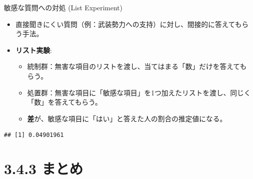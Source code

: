 \documentclass[
  ignorenonframetext,
]{beamer}
\newenvironment{Shaded}{\begin{snugshade}}{\end{snugshade}}
\newcommand{\CommentTok}[1]{\textcolor[rgb]{0.56,0.35,0.01}{\textit{#1}}}
\newcommand{\FunctionTok}[1]{\textcolor[rgb]{0.00,0.00,0.00}{#1}}
\newcommand{\NormalTok}[1]{#1}
\newcommand{\SpecialCharTok}[1]{\textcolor[rgb]{0.00,0.00,0.00}{#1}}
\newcommand{\StringTok}[1]{\textcolor[rgb]{0.31,0.60,0.02}{#1}}
\providecommand{\tightlist}{%
  \setlength{\itemsep}{0pt}\setlength{\parskip}{0pt}}
\begin{document}
\begin{frame}[fragile]{敏感な質問への対処 (List Experiment)}
\protect\hypertarget{ux654fux611fux306aux8ceaux554fux3078ux306eux5bfeux51e6-list-experiment}{}
\begin{itemize}
\tightlist
\item
  直接聞きにくい質問（例：武装勢力への支持）に対し、間接的に答えてもらう手法。
\item
  \textbf{リスト実験}:

  \begin{itemize}
  \tightlist
  \item
    統制群：無害な項目のリストを渡し、当てはまる「数」だけを答えてもらう。
  \item
    処置群：無害な項目に「敏感な項目」を1つ加えたリストを渡し、同じく「数」を答えてもらう。
  \item
    \textbf{差}が、敏感な項目に「はい」と答えた人の割合の推定値になる。
  \end{itemize}
\end{itemize}

\scriptsize

\begin{Shaded}
\end{Shaded}

\begin{verbatim}
## [1] 0.04901961
\end{verbatim}

\normalsize
\end{frame}

\hypertarget{ux307eux3068ux3081}{%
\section{3.4.3 まとめ}\label{ux307eux3068ux3081}}
\end{document}
